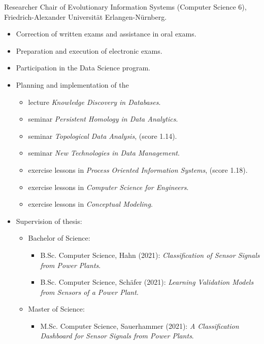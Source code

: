 \documentclass[a4paper, 11pt]{article}
\newcommand{\years}[1]{\marginnote{\scriptsize #1}}
\begin{document}
	\years{2018--21} Researcher Chair of Evolutionary Information Systems (Computer Science 6), Friedrich-Alexander Universität Erlangen-Nürnberg.
	\begin{itemize}
		\item Correction of written exams and assistance in oral exams.

		\item Preparation and execution of electronic exams.

		\item Participation in the Data Science program.

		\item Planning and implementation of the
			\begin{itemize}
				\item lecture \emph{Knowledge Discovery in Databases}.

				\item seminar \emph{Persistent Homology in Data Analytics}.

				\item seminar \emph{Topological Data Analysis}, (score 1.14).

				\item seminar \emph{New Technologies in Data Management}.

				\item exercise lessons in \emph{Process Oriented Information Systems}, (score 1.18).

				\item exercise lessons in \emph{Computer Science for Engineers}.

				\item exercise lessons in \emph{Conceptual Modeling}.
			\end{itemize}

		\item Supervision of thesis:
			\begin{itemize}[noitemsep, leftmargin=*]
				\item Bachelor of Science:
					\begin{itemize}
						\item B.Sc. Computer Science, Hahn (2021): \emph{Classification of Sensor
							Signals from Power Plants}.

						\item B.Sc. Computer Science, Schäfer (2021): \emph{Learning Validation
							Models from Sensors of a Power Plant}.
					\end{itemize}

				\item Master of Science:
					\begin{itemize}
						\item M.Sc. Computer Science, Sauerhammer (2021): \emph{A Classification
							Dashboard for Sensor Signals from Power Plants}.


\end{itemize}
\end{itemize}
\end{itemize}
\end{document}
